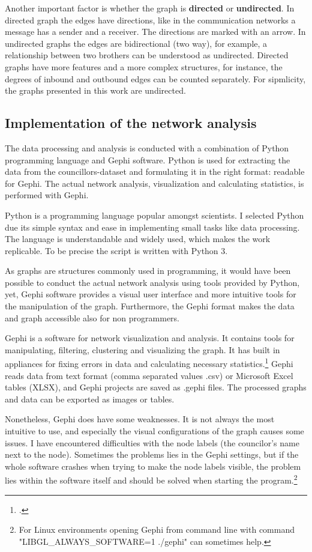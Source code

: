 Another important factor is whether the graph is \textbf{directed} or \textbf{undirected}. In directed graph the edges have directions, like in the communication networks a message has a sender and a receiver. The directions are marked with an arrow. In undirected graphs the edges are bidirectional (two way), for example, a relationship between two brothers can be understood as undirected. Directed graphs have more features and a more complex structures, for instance, the degrees of inbound and outbound edges can be counted separately. For sipmlicity, the graphs presented in this work are undirected.

\subsection{Implementation of the network analysis}
The data processing and analysis is conducted with a combination of Python programming language and Gephi software. Python is used for extracting the data from the councillors-dataset and formulating it in the right format: readable for Gephi. The actual network analysis, visualization and calculating statistics, is performed with Gephi. 

Python is a programming language popular amongst scientists. I selected Python due its simple syntax and ease in implementing small tasks like data processing. The language is understandable and widely used, which makes the work replicable. To be precise the script is written with Python 3.

As graphs are structures commonly used in programming, it would have been possible to conduct the actual network analysis using tools provided by Python, yet, Gephi software provides a visual user interface and more intuitive tools for the manipulation of the graph. Furthermore, the Gephi format makes the data and graph accessible also for non programmers.

Gephi is a software for network visualization and analysis. It contains tools for manipulating, filtering, clustering and visualizing the graph. It has built in appliances for fixing errors in data and calculating necessary statistics.\footcite{gephi} Gephi reads data from text format (comma separated values .csv) or Microsoft Excel tables (XLSX), and Gephi projects are saved as .gephi files. The processed graphs and data can be exported as images or tables.  

Nonetheless, Gephi does have some weaknesses. It is not always the most intuitive to use, and especially the visual configurations of the graph causes some issues. I have encountered difficulties with the node labels (the councilor's name next to the node). Sometimes the problems lies in the Gephi settings, but if the whole software crashes when trying to make the node labels visible, the problem lies within the software itself and should be solved when starting the program.\footnote{For Linux environments opening Gephi from command line with command "LIBGL\_ALWAYS\_SOFTWARE=1 ./gephi" can sometimes help.} 

